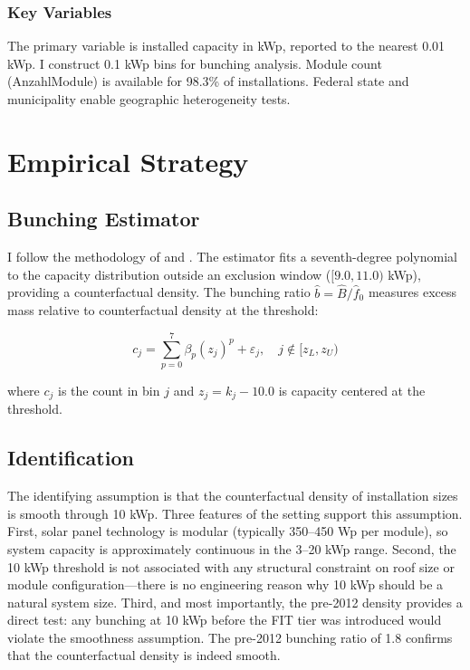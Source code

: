 \documentclass[12pt]{article}
\begin{document}
\subsubsection*{Key Variables} The primary variable is installed capacity in kWp, reported to the nearest 0.01 kWp. I construct 0.1 kWp bins for bunching analysis. Module count (AnzahlModule) is available for 98.3\% of installations. Federal state and municipality enable geographic heterogeneity tests.




\section{Empirical Strategy}
\label{sec:strategy}

\subsection{Bunching Estimator}

I follow the methodology of \citet{saez2010taxpayers} and \citet{kleven2013using}. The estimator fits a seventh-degree polynomial to the capacity distribution outside an exclusion window ($[9.0, 11.0)$ kWp), providing a counterfactual density. The bunching ratio $\hat{b} = \hat{B}/\hat{f}_0$ measures excess mass relative to counterfactual density at the threshold:

\begin{equation}
c_j = \sum_{p=0}^{7} \beta_p (z_j)^p + \varepsilon_j, \quad j \notin [z_L, z_U)
\end{equation}

where $c_j$ is the count in bin $j$ and $z_j = k_j - 10.0$ is capacity centered at the threshold.

\subsection{Identification}

The identifying assumption is that the counterfactual density of installation sizes is smooth through 10 kWp. Three features of the setting support this assumption. First, solar panel technology is modular (typically 350--450 Wp per module), so system capacity is approximately continuous in the 3--20 kWp range. Second, the 10 kWp threshold is not associated with any structural constraint on roof size or module configuration---there is no engineering reason why 10 kWp should be a natural system size. Third, and most importantly, the pre-2012 density provides a direct test: any bunching at 10 kWp before the FIT tier was introduced would violate the smoothness assumption. The pre-2012 bunching ratio of 1.8 confirms that the counterfactual density is indeed smooth.
\end{document}
